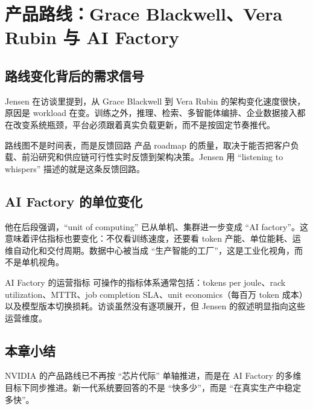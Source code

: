 \section{产品路线：Grace Blackwell、Vera Rubin 与 AI Factory}

\subsection{路线变化背后的需求信号}

Jensen 在访谈里提到，从 Grace Blackwell 到 Vera Rubin 的架构变化速度很快，原因是 workload 在变。训练之外，推理、检索、多智能体编排、企业数据接入都在改变系统瓶颈，平台必须跟着真实负载更新，而不是按固定节奏推代。

\begin{importantbox}{路线图不是时间表，而是反馈回路}
产品 roadmap 的质量，取决于能否把客户负载、前沿研究和供应链可行性实时反馈到架构决策。Jensen 用 ``listening to whispers'' 描述的就是这条反馈回路。
\end{importantbox}

\subsection{AI Factory 的单位变化}

他在后段强调，``unit of computing'' 已从单机、集群进一步变成 ``AI factory''。这意味着评估指标也要变化：不仅看训练速度，还要看 token 产能、单位能耗、运维自动化和交付周期。数据中心被当成 ``生产智能的工厂''，这是工业化视角，而不是单机视角。

\begin{knowledgebox}{AI Factory 的运营指标}
可操作的指标体系通常包括：tokens per joule、rack utilization、MTTR、job completion SLA、unit economics（每百万 token 成本）以及模型版本切换损耗。访谈虽然没有逐项展开，但 Jensen 的叙述明显指向这些运营维度。
\end{knowledgebox}

\subsection{本章小结}

NVIDIA 的产品路线已不再按 ``芯片代际'' 单轴推进，而是在 AI Factory 的多维目标下同步推进。新一代系统要回答的不是 ``快多少''，而是 ``在真实生产中稳定多快''。

